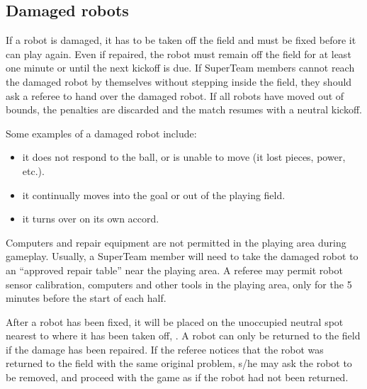 \documentclass{article}
\begin{document}
\subsection{Damaged robots \label{ref-012}}

If a robot is damaged, it has to be taken off the field and must be fixed
before it can play again. Even if repaired, the robot must remain off the field
for at least one minute or until the next kickoff is due. If SuperTeam members
cannot reach the damaged robot by themselves without stepping inside the field,
they should ask a referee to hand over the damaged robot.  If all robots have
moved out of bounds, the penalties are discarded and the match resumes with a
neutral kickoff.

Some examples of a damaged robot include:

\begin{itemize}

\item it does not respond to the ball, or is unable to move (it lost pieces,
    power, etc.).

\item it continually moves into the goal or out of the playing field.

\item it turns over on its own accord.

\end{itemize}


Computers and repair equipment are not permitted in the playing area during
gameplay. Usually, a SuperTeam member will need to take the damaged robot to an
``approved repair table'' near the playing area. A referee may permit robot sensor
calibration, computers and other tools in the playing area, only for the 5
minutes before the start of each half. 

After a robot has been fixed, it will be placed on the unoccupied neutral spot
nearest to where it has been taken off, .
A robot can only be returned to the field if the damage has been
repaired. If the referee notices that the robot was returned to the field with
the same original problem, s/he may ask the robot to be removed, and proceed
with the game as if the robot had not been returned.
\end{document}
